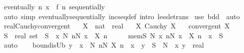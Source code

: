 \begin{isabellebody}
\ {\isachardoublequoteopen}eventually\ {\isacharparenleft}{\kern0pt}{\isasymlambda}n{\isachardot}{\kern0pt}\ x\ {\isacharless}{\kern0pt}\ f\ n{\isacharparenright}{\kern0pt}\ sequentially{\isachardoublequoteclose}\isanewline
\ \ \ \ \isamarkupfalse%
\ {\isacharparenleft}{\kern0pt}auto\ simp{\isacharcolon}{\kern0pt}\ eventually{\isacharunderscore}{\kern0pt}sequentially\ incseq{\isacharunderscore}{\kern0pt}def\ intro{\isacharcolon}{\kern0pt}\ less{\isacharunderscore}{\kern0pt}le{\isacharunderscore}{\kern0pt}trans{\isacharparenright}{\kern0pt}\isanewline
{}\isamarkupfalse%
\ {\isacharparenleft}{\kern0pt}use\ bdd\ \ auto{\isacharparenright}{\kern0pt}%
\endisatagproof
{\isafoldproof}%
%
\isadelimproof
\isanewline
%
\endisadelimproof
\isanewline
{}\isamarkupfalse%
\ real{\isacharunderscore}{\kern0pt}Cauchy{\isacharunderscore}{\kern0pt}convergent{\isacharcolon}{\kern0pt}\isanewline
\ \ \ X\ {\isacharcolon}{\kern0pt}{\isacharcolon}{\kern0pt}\ {\isachardoublequoteopen}nat\ {\isasymRightarrow}\ real{\isachardoublequoteclose}\isanewline
\ \ \ X{\isacharcolon}{\kern0pt}\ {\isachardoublequoteopen}Cauchy\ X{\isachardoublequoteclose}\isanewline
\ \ \ {\isachardoublequoteopen}convergent\ X{\isachardoublequoteclose}\isanewline
%
\isadelimproof
%
\endisadelimproof
%
\isatagproof
{}\isamarkupfalse%
\ {\isacharminus}{\kern0pt}\isanewline
\ \ \isamarkupfalse%
\ S\ {\isacharcolon}{\kern0pt}{\isacharcolon}{\kern0pt}\ {\isachardoublequoteopen}real\ set{\isachardoublequoteclose}\ \ {\isachardoublequoteopen}S\ {\isacharequal}{\kern0pt}\ {\isacharbraceleft}{\kern0pt}x{\isachardot}{\kern0pt}\ {\isasymexists}N{\isachardot}{\kern0pt}\ {\isasymforall}n{\isasymge}N{\isachardot}{\kern0pt}\ x\ {\isacharless}{\kern0pt}\ X\ n{\isacharbraceright}{\kern0pt}{\isachardoublequoteclose}\isanewline
\ \ \isamarkupfalse%
\ \isamarkupfalse%
\ mem{\isacharunderscore}{\kern0pt}S{\isacharcolon}{\kern0pt}\ {\isachardoublequoteopen}{\isasymAnd}N\ x{\isachardot}{\kern0pt}\ {\isasymforall}n{\isasymge}N{\isachardot}{\kern0pt}\ x\ {\isacharless}{\kern0pt}\ X\ n\ {\isasymLongrightarrow}\ x\ {\isasymin}\ S{\isachardoublequoteclose}\isanewline
\ \ \ \ \isamarkupfalse%
\ auto\isanewline
\isanewline
\ \ \isamarkupfalse%
\ bound{\isacharunderscore}{\kern0pt}isUb{\isacharcolon}{\kern0pt}\ {\isachardoublequoteopen}y\ {\isasymle}\ x{\isachardoublequoteclose}\ \ N{\isacharcolon}{\kern0pt}\ {\isachardoublequoteopen}{\isasymforall}n{\isasymge}N{\isachardot}{\kern0pt}\ X\ n\ {\isacharless}{\kern0pt}\ x{\isachardoublequoteclose}\ \ {\isachardoublequoteopen}y\ {\isasymin}\ S{\isachardoublequoteclose}\ \ N\ \ x\ y\ {\isacharcolon}{\kern0pt}{\isacharcolon}{\kern0pt}\ real\isanewline

\end{isabellebody}
